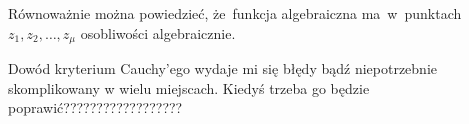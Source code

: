 \documentclass[a4paper,11pt]{article}
\begin{document}
\vspace{\spaceFour}





\noindent
{}

\vspace{\spaceFour}





\noindent
{} Równoważnie można powiedzieć, że~funkcja algebraiczna
ma~w~punktach $z_{ 1 }, z_{ 2 }, \ldots, z_{ \mu }$ osobliwości algebraicznie.

\vspace{\spaceFour}





\noindent
{} Dowód kryterium Cauchy'ego wydaje mi się błędy bądź niepotrzebnie
skomplikowany w wielu miejscach. Kiedyś trzeba go będzie
poprawić??????????????????

\vspace{\spaceFour}










\newpage

\end{document}
